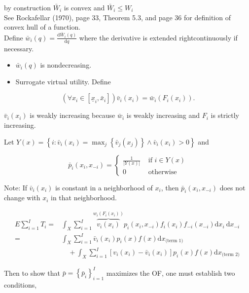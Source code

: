\documentclass[10pt]{article}
\begin{document}
by construction $\bar{W}_{i}$ is convex and $\bar{W}_{i} \leq W_{i}$\\
See Rockafellar (1970), page 33, Theorem 5.3, and page 36 for definition of convex hull of a function.\\
Define $\bar{w}_{i}(q)=\frac{\mathrm{d} \bar{W}_{i}(q)}{\mathrm{d} q}$ where the derivative is extended rightcontinuously if necessary.

\begin{itemize}
  \item $\bar{w}_{i}(q)$ is nondecreasing.
  \item Surrogate virtual utility. Define
\end{itemize}

$$
\left(\forall x_{i} \in\left[\underline{x}_{i}, \bar{x}_{i}\right]\right) \bar{v}_{i}\left(x_{i}\right)=\bar{w}_{i}\left(F_{i}\left(x_{i}\right)\right) .
$$

$\bar{v}_{i}\left(x_{i}\right)$ is weakly increasing because $\bar{w}_{i}$ is weakly increasing and $F_{i}$ is strictly increasing.

Let $Y(x)=\left\{i: \bar{v}_{i}\left(x_{i}\right)=\max _{j}\left\{\bar{v}_{j}\left(x_{j}\right)\right\} \wedge \bar{v}_{i}\left(x_{i}\right)>0\right\}$ and

$$
\bar{p}_{i}\left(x_{i}, x_{-i}\right)= \begin{cases}\frac{1}{|Y(x)|} & \text { if } i \in Y(x) \\ 0 & \text { otherwise }\end{cases}
$$

Note: If $\bar{v}_{i}\left(x_{i}\right)$ is constant in a neighborhood of $x_{i}$, then $\bar{p}_{i}\left(x_{i}, x_{-i}\right)$ does not change with $x_{i}$ in that neighborhood.

$$
\begin{aligned}
E \sum_{i=1}^{I} T_{i}= & \int_{X} \sum_{i=1}^{I} \overbrace{v_{i}\left(x_{i}\right)}^{w_{i}\left(F_{i}\left(x_{i}\right)\right)} p_{i}\left(x_{i}, x_{-i}\right) f_{i}\left(x_{i}\right) f_{-i}\left(x_{-i}\right) \mathrm{d} x_{i} \mathrm{~d} x_{-i} \\
= & \int_{X} \sum_{i=1}^{I} \bar{v}_{i}\left(x_{i}\right) p_{i}(x) f(x) \mathrm{d} x_{\text {(term 1) }} \\
& \quad+\int_{X} \sum_{i=1}^{I}\left[v_{i}\left(x_{i}\right)-\bar{v}_{i}\left(x_{i}\right)\right] p_{i}(x) f(x) \mathrm{d} x_{\text {(term 2) }}
\end{aligned}
$$

Then to show that $\bar{p}=\left\{\bar{p}_{i}\right\}_{i=1}^{I}$ maximizes the OF, one must establish two conditions,
\end{document}
